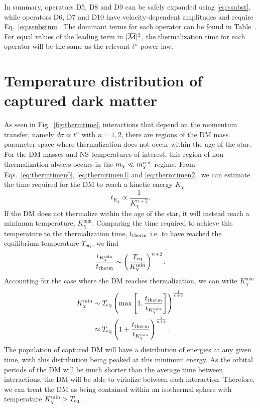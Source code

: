 In summary, operators D5, D8 and D9 can be safely expanded using \ref{eq:ssubst}, while operators D6, D7 and D10 have velocity-dependent amplitudes and require Eq.~\ref{eq:ssubstmu}. 
The dominant terms for each operator can be found in Table~. 
For equal values of the leading term in $|\overline{\mathcal M}|^2$, the thermalization time for each operator will be the same as the relevant $t^n$ power law. 


\section{Temperature distribution of captured dark matter}
\label{sec:minTempDerivation}



As seen in Fig.~\ref{fig:thermtime}, interactions that depend on the momentum transfer, namely $d\sigma \propto t^n$ with $n = 1,2$, there are regions of the DM mass parameter space where thermalization does not occur within the age of the star. For the DM masses and NS temperatures of interest, this region of non-thermalization always occurs in the $m_\chi\ll m_\chi^{\rm crit}$ regime.
From Eqs.~\ref{eq:thermtimen0}, \ref{eq:thermtimen1} and \ref{eq:thermtimen2},  we can estimate the time required for the DM to reach a kinetic energy $K_\chi$ 
\begin{equation}
    t_{K_\chi} \propto \frac{1}{K_\chi^{n+2}}.
\end{equation}
% 
If the DM does not thermalize within the age of the star, it will instead reach a minimum temperature, $K_\chi^{\mathrm{min}}$.  Comparing the time required to achieve this temperature to the thermalization time, $t_{\rm therm}$ i.e. to have reached the equilibrium temperature $T_{\rm eq}$, we find 
\begin{equation}
    \frac{t_{K_\chi^\mathrm{min}}}{t_{\rm therm}}  \sim \left( \frac{T_{\rm eq}}{K^{\rm min}_\chi} \right)^{n+2}. 
\end{equation}
Accounting for the case where the DM reaches thermalization, we can write $K_\chi^\mathrm{min}$
\begin{align}
    K^{\rm min}_\chi & \sim T_{\rm eq} \left(\max\left[ 1,\frac{t_{\rm therm}}{t_{K_\chi^\mathrm{min}}}\right ]\right)^{\frac{1}{n + 2}}\\
           & \approx T_{\rm eq} \left( 1 + \frac{t_{\rm therm}}{t_{K_\chi^\mathrm{min}}}\right )^{\frac{1}{n + 2}}. 
\end{align}
The population of captured DM will have a distribution of energies at any given time, with this distribution being peaked at this minimum energy.
As the orbital periods of the DM will be much shorter than the average time between interactions, the DM will be able to virialize between each interaction. Therefore, we can treat the DM as being contained within an isothermal sphere with temperature $K^{\rm min}_\chi > T_{\rm eq}$. 

